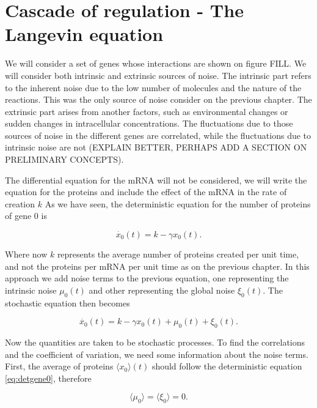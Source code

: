 \chapter{Cascade of regulation - The Langevin equation}

We will consider a set of genes whose interactions are shown on figure FILL. We will consider both intrinsic and extrinsic sources of noise. The intrinsic part refers to the inherent noise due to the low number of molecules and the nature of the reactions. This was the only source of noise consider on the previous chapter. The extrinsic part arises from another factors, such as environmental changes or sudden changes in intracellular concentrations. The fluctuations due to those sources of noise in the different genes are correlated, while the fluctuations due to intrinsic noise are not (EXPLAIN BETTER, PERHAPS ADD A SECTION ON PRELIMINARY CONCEPTS).

The differential equation for the mRNA will not be considered, we will write the equation for the proteins and include the effect of the mRNA in the rate of creation $k$ As we have seen, the deterministic equation for the number of proteins of gene $0$ is 

\begin{equation}
\label{eq:detgene0}
\dot{x_0}(t) = k - \gamma x_0(t).
\end{equation}

Where now $k$ represents the average number of proteins created per unit time, and not the proteins per mRNA per unit time as on the previous chapter. In this approach we add noise terms to the previous equation, one representing the intrinsic noise $\mu_0(t)$ and other representing the global noise $\xi_0(t)$. The stochastic equation then becomes

\begin{equation}
\label{eq:gene0}
\dot{x_0}(t) = k - \gamma x_0(t) + \mu_0(t) + \xi_0(t).
\end{equation}

Now the quantities are taken to be stochastic processes. To find the correlations and the coefficient of variation, we need some information about the noise terms. First, the average of proteins $\langle x_0 \rangle (t)$ should follow the deterministic equation \ref{eq:detgene0}, therefore

\begin{equation}
\langle\mu_0\rangle = \langle\xi_0\rangle = 0.
\end{equation}

